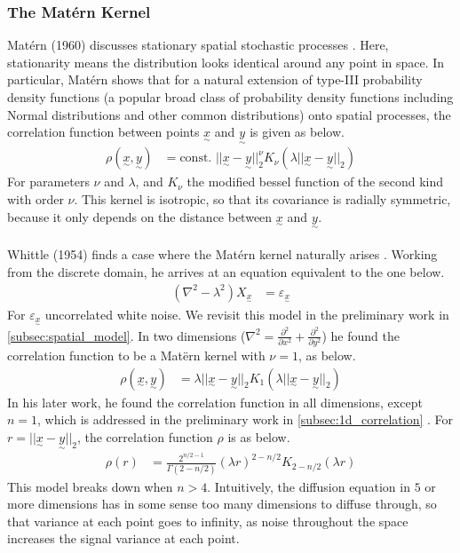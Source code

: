 \documentclass[12pt,a4paper]{article} %
\newcommand{\ve}[1]{\underset{\sim}{#1}}
\begin{document}
\subsubsection{The Mat\'{e}rn Kernel}
\label{subsec:matern}
Mat\'{e}rn (1960) discusses stationary spatial stochastic processes \cite{matern}. Here, stationarity means the distribution looks identical around any point in space. In particular, Mat\'{e}rn shows that for a natural extension of type-III probability density functions (a popular broad class of probability density functions including Normal distributions and other common distributions) onto spatial processes, the correlation function between points $\ve{x}$ and $\ve{y}$ is given as below.
\begin{align*}
    \rho(\ve{x},\ve{y})&=\text{const. }||\ve{x}-\ve{y}||_2^\nu K_\nu(\lambda||\ve{x}-\ve{y}||_2)
\end{align*}
For parameters $\nu$ and $\lambda$, and $K_\nu$ the modified bessel function of the second kind with order $\nu$. This kernel is isotropic, so that its covariance is radially symmetric, because it only depends on the distance between $\ve{x}$ and $\ve{y}$.\\\\
Whittle (1954) finds a case where the Mat\'{e}rn kernel naturally arises \cite{whittle2}. Working from the discrete domain, he arrives at an equation equivalent to the one below.
\begin{align*}
    (\nabla^2-\lambda^2)X_{\ve{x}}&=\varepsilon_{\ve{x}}
\end{align*}
For $\varepsilon_{\ve{x}}$ uncorrelated white noise. We revisit this model in the preliminary work in \ref{subsec:spatial_model}. In two dimensions ($\nabla^2=\frac{\partial^2}{\partial x^2}+\frac{\partial^2}{\partial y^2}$) he found the correlation function to be a Mat\"{e}rn kernel with $\nu=1$, as below.
\begin{align*}
    \rho(\ve{x},\ve{y})&=\lambda||\ve{x}-\ve{y}||_2 K_1(\lambda||\ve{x}-\ve{y}||_2)
\end{align*}
In his later work, he found the correlation function in all dimensions, except $n=1$, which is addressed in the preliminary work in \ref{subsec:1d_correlation} \cite{whittle}. For $r=||\ve{x}-\ve{y}||_2$, the correlation function $\rho$ is as below.
\begin{align*}
    \rho(r)&=\frac{2^{n/2-1}}{\Gamma(2-n/2)}(\lambda r)^{2-n/2}K_{2-n/2}(\lambda r)
\end{align*}
This model breaks down when $n>4$. Intuitively, the diffusion equation in $5$ or more dimensions has in some sense too many dimensions to diffuse through, so that variance at each point goes to infinity, as noise throughout the space increases the signal variance at each point.
\end{document}
